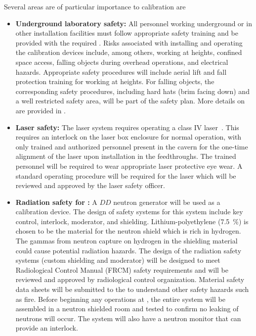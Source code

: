 Several areas are of particular importance to calibration are
\begin{itemize}
\item {\bf Underground laboratory safety:} All personnel working underground or in other installation facilities must follow appropriate safety training and be provided with the required . Risks associated with installing and operating the calibration devices include, among others, working at heights, confined space access, falling objects during overhead operations, and electrical hazards. Appropriate safety procedures will include aerial lift and fall protection training for working at heights. For falling objects, the corresponding safety procedures, including hard hats (brim facing down) and a well restricted safety area, will be part of the safety plan. More details on  are provided in  \tcchesh.

\item {\bf Laser safety:} The laser system requires operating a class IV laser~\cite{FNAL:Class4Lasers,CERN:Class4Lasers}. This requires an interlock on the laser box enclosure for normal operation, with only trained and authorized personnel present in the cavern for the one-time alignment of the laser upon installation in the feedthroughs. The trained personnel will be required to wear appropriate laser protective eye wear. A standard operating procedure will be required for the laser which will be reviewed and approved by the  laser safety officer. 

\item {\bf Radiation safety for :} A $DD$ neutron generator will be used as a calibration device. The design of safety systems for this system include key control, interlock, moderator, and shielding. Lithium-polyethylene (\SI{7.5}{\%}) is chosen to be the material for the neutron shield which is rich in hydrogen. The gammas from neutron capture on hydrogen in the shielding material could cause potential radiation hazards. The design of the radiation safety systems (custom shielding and moderator) will be designed to meet  Radiological Control Manual (FRCM) safety requirements and will be reviewed and approved by  radiological control organization. Material safety data sheets will be submitted to the   to understand other safety hazards such as fire. Before beginning any operations at , the entire system will be assembled in a neutron shielded room and tested to confirm no leaking of neutrons will occur. The system will also have a neutron monitor that can provide an interlock. 


\end{itemize}
